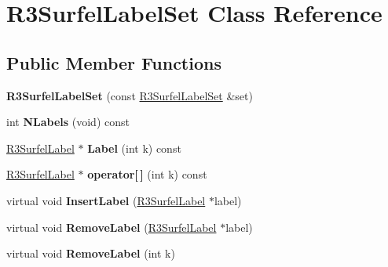 \hypertarget{class_r3_surfel_label_set}{}\section{R3\+Surfel\+Label\+Set Class Reference}
\label{class_r3_surfel_label_set}
\subsection*{Public Member Functions}
\begin{DoxyCompactItemize}
\item 
{\bfseries R3\+Surfel\+Label\+Set} (const \hyperlink{class_r3_surfel_label_set}{R3\+Surfel\+Label\+Set} \&set)\hypertarget{class_r3_surfel_label_set_a031bca208c2bb6d66b327e5549b47369}{}\label{class_r3_surfel_label_set_a031bca208c2bb6d66b327e5549b47369}

\item 
int {\bfseries N\+Labels} (void) const \hypertarget{class_r3_surfel_label_set_ad144d7997a9c50cb2d07aa804877328a}{}\label{class_r3_surfel_label_set_ad144d7997a9c50cb2d07aa804877328a}

\item 
\hyperlink{class_r3_surfel_label}{R3\+Surfel\+Label} $\ast$ {\bfseries Label} (int k) const \hypertarget{class_r3_surfel_label_set_aeddef05650b16ed5188bf16d5f9ca4b7}{}\label{class_r3_surfel_label_set_aeddef05650b16ed5188bf16d5f9ca4b7}

\item 
\hyperlink{class_r3_surfel_label}{R3\+Surfel\+Label} $\ast$ {\bfseries operator\mbox{[}$\,$\mbox{]}} (int k) const \hypertarget{class_r3_surfel_label_set_a34268796991f7f6be097aa49fbb79057}{}\label{class_r3_surfel_label_set_a34268796991f7f6be097aa49fbb79057}

\item 
virtual void {\bfseries Insert\+Label} (\hyperlink{class_r3_surfel_label}{R3\+Surfel\+Label} $\ast$label)\hypertarget{class_r3_surfel_label_set_a80e1e8306e033da9f12072de07e9ad44}{}\label{class_r3_surfel_label_set_a80e1e8306e033da9f12072de07e9ad44}

\item 
virtual void {\bfseries Remove\+Label} (\hyperlink{class_r3_surfel_label}{R3\+Surfel\+Label} $\ast$label)\hypertarget{class_r3_surfel_label_set_a31821c5446c048f566d93fb1ae9beeed}{}\label{class_r3_surfel_label_set_a31821c5446c048f566d93fb1ae9beeed}

\item 
virtual void {\bfseries Remove\+Label} (int k)\hypertarget{class_r3_surfel_label_set_ab3b89e1f7ac1c49d41475f5b589bc7b4}{}\label{class_r3_surfel_label_set_ab3b89e1f7ac1c49d41475f5b589bc7b4}


\end{DoxyCompactItemize}

